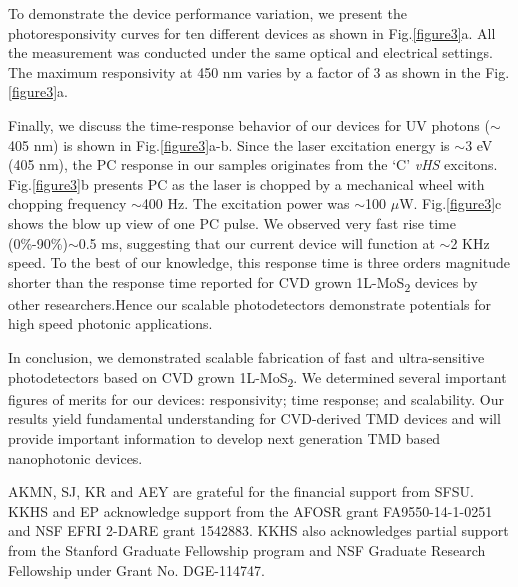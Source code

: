 \documentclass[%
 reprint,%
 amssymb, amsmath,%
 aip,cha,%
]{revtex4-1}
\begin{document}
To demonstrate the device performance variation, we present the photoresponsivity curves for ten different devices as shown in Fig.\ref{figure3}a. All the measurement was conducted under the same optical and electrical settings. The maximum responsivity at 450 nm varies by a factor of 3 as shown in the Fig.\ref{figure3}a. 

Finally, we discuss the time-response behavior of our devices for UV photons ($\sim$405 nm) is shown in Fig.\ref{figure3}a-b. Since the laser excitation energy is $\sim$3 eV (405 nm), the PC response in our samples originates from the `C' \textit{vHS} excitons. Fig.\ref{figure3}b presents PC as the laser is chopped by a mechanical wheel with chopping frequency $\sim$400 Hz. The excitation power was $\sim$100 $\mu$W. Fig.\ref{figure3}c shows the blow up view of one PC pulse. We observed very fast rise time (0\%-90\%)$\sim$0.5 ms, suggesting that our current device will function at $\sim$2 KHz speed. To the best of our knowledge, this response time is three orders magnitude shorter than the response time reported for CVD grown 1L-MoS\textsubscript{2} devices by other researchers.\cite{21}Hence our scalable photodetectors demonstrate potentials for high speed photonic applications. 

In conclusion, we demonstrated scalable fabrication of fast and ultra-sensitive photodetectors based on CVD grown 1L-MoS\textsubscript{2}. We determined several important figures of merits for our devices: responsivity; time response; and scalability. Our results yield fundamental understanding for CVD-derived TMD devices and will provide important information to develop next generation TMD based nanophotonic devices.

AKMN, SJ, KR and AEY are grateful for the financial support from SFSU. KKHS and EP acknowledge support from the AFOSR grant FA9550-14-1-0251 and NSF EFRI 2-DARE grant 1542883. KKHS also acknowledges partial support from the Stanford Graduate Fellowship program and NSF Graduate Research Fellowship under Grant No. DGE-114747. 


\end{document}

